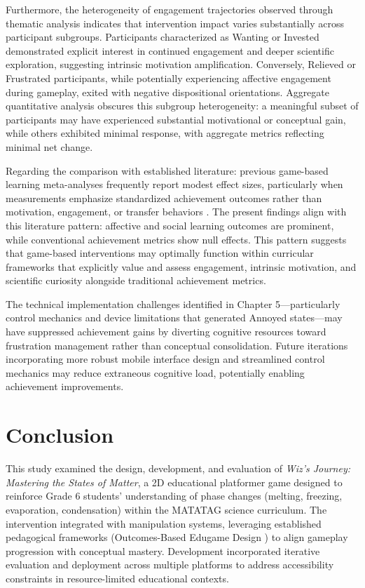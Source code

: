 Furthermore, the heterogeneity of engagement trajectories observed through thematic analysis indicates that intervention impact varies substantially across participant subgroups. Participants characterized as Wanting or Invested demonstrated explicit interest in continued engagement and deeper scientific exploration, suggesting intrinsic motivation amplification. Conversely, Relieved or Frustrated participants, while potentially experiencing affective engagement during gameplay, exited with negative dispositional orientations. Aggregate quantitative analysis obscures this subgroup heterogeneity: a meaningful subset of participants may have experienced substantial motivational or conceptual gain, while others exhibited minimal response, with aggregate metrics reflecting minimal net change.

Regarding the comparison with established literature: previous game-based learning meta-analyses frequently report modest effect sizes, particularly when measurements emphasize standardized achievement outcomes rather than motivation, engagement, or transfer behaviors \cite{Plass2015, Clark2016, Wouters2013}. The present findings align with this literature pattern: affective and social learning outcomes are prominent, while conventional achievement metrics show null effects. This pattern suggests that game-based interventions may optimally function within curricular frameworks that explicitly value and assess engagement, intrinsic motivation, and scientific curiosity alongside traditional achievement metrics.

The technical implementation challenges identified in Chapter 5---particularly control mechanics and device limitations that generated Annoyed states---may have suppressed achievement gains by diverting cognitive resources toward frustration management rather than conceptual consolidation. Future iterations incorporating more robust mobile interface design and streamlined control mechanics may reduce extraneous cognitive load, potentially enabling achievement improvements.

\section{Conclusion}

This study examined the design, development, and evaluation of \textit{Wiz's Journey: Mastering the States of Matter}, a 2D educational platformer game designed to reinforce Grade 6 students' understanding of phase changes (melting, freezing, evaporation, condensation) within the MATATAG science curriculum. The intervention integrated  with  manipulation systems, leveraging established pedagogical frameworks (Outcomes-Based Edugame Design \cite{Sison2018}) to align gameplay progression with conceptual mastery. Development incorporated iterative evaluation and deployment across multiple platforms to address accessibility constraints in resource-limited educational contexts.

